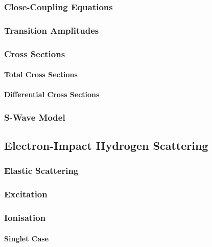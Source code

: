 \documentclass[draft]{article}
\begin{document}
\subsubsection{Close-Coupling Equations}
\label{sec:cc-equations}

\subsubsection{Transition Amplitudes}
\label{sec:transition-amplitudes}

\subsubsection{Cross Sections}
\label{sec:cross-sections}

\paragraph{Total Cross Sections}

\paragraph{Differential Cross Sections}

\subsubsection{S-Wave Model}
\label{sec:s-wave-model}

\subsection{Electron-Impact Hydrogen Scattering}
\label{sec:e-h}

\subsubsection{Elastic Scattering}
\label{sec:e-h-elastic-scattering}

\subsubsection{Excitation}
\label{sec:e-h-excitation}

\subsubsection{Ionisation}
\label{sec:e-h-ionisation}

\paragraph{Singlet Case}
\end{document}

